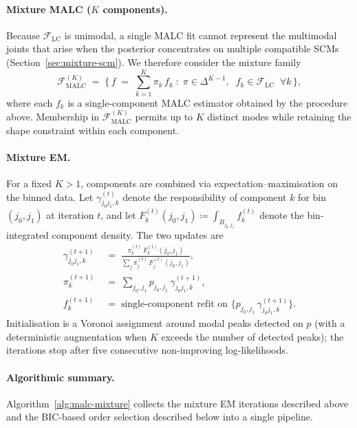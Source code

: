 \documentclass[11pt]{article}
\theoremstyle{plain}
\theoremstyle{definition}
\theoremstyle{remark}
\begin{document}
\paragraph{Mixture MALC ($K$ components).}
Because $\mathcal{F}_{\mathrm{LC}}$ is unimodal, a single MALC fit
cannot represent the multimodal joints that arise when the posterior
concentrates on multiple compatible SCMs
(Section~\ref{sec:mixture-scm}). We therefore consider the mixture
family
\begin{equation}
  \mathcal{F}_{\mathrm{MALC}}^{(K)}
  \;=\;
  \Big\{\,
    f \;=\; \sum_{k=1}^{K} \pi_k\, f_k
    \;:\;
    \pi \in \Delta^{K-1},\;\;
    f_k \in \mathcal{F}_{\mathrm{LC}}\;\;\forall k
  \,\Big\},
  \label{eq:malc-family}
\end{equation}
where each $f_k$ is a single-component MALC estimator obtained by the
procedure above. Membership in $\mathcal{F}_{\mathrm{MALC}}^{(K)}$
permits up to $K$ distinct modes while retaining the shape constraint
within each component.

\paragraph{Mixture EM.}
For a fixed $K > 1$, components are combined via expectation--maxi\-mi\-sa\-tion
on the binned data. Let $\gamma_{j_0 j_1, k}^{(t)}$ denote the
responsibility of component $k$ for bin $(j_0, j_1)$ at iteration $t$,
and let $F_k^{(t)}(j_0, j_1) \coloneqq \int_{B_{j_0, j_1}} f_k^{(t)}$
denote the bin-integrated component density. The two updates are
\begin{align}
  \gamma_{j_0 j_1, k}^{(t+1)}
  \;&=\;
  \frac{\pi_k^{(t)}\, F_k^{(t)}(j_0, j_1)}
       {\sum_{j} \pi_j^{(t)}\, F_j^{(t)}(j_0, j_1)},
  \label{eq:malc-estep}
  \\[2pt]
  \pi_k^{(t+1)}
  \;&=\;
  \sum_{j_0, j_1} p_{j_0, j_1}\, \gamma_{j_0 j_1, k}^{(t+1)},
  \label{eq:malc-pi-update}
  \\[2pt]
  f_k^{(t+1)}
  \;&=\;
  \text{single-component refit on }
  \{p_{j_0, j_1}\, \gamma_{j_0 j_1, k}^{(t+1)}\}.
  \label{eq:malc-mstep}
\end{align}
Initialisation is a Voronoi assignment around modal peaks detected on
$p$ (with a deterministic augmentation when $K$ exceeds the number of
detected peaks); the iterations stop after five consecutive non-improving
log-likelihoods.

\paragraph{Algorithmic summary.}
Algorithm~\ref{alg:malc-mixture} collects the mixture EM iterations
described above and the BIC-based order selection described below into
a single pipeline. 
\end{document}
